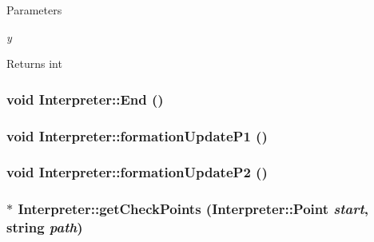 \begin{DoxyParams}{Parameters}
\item[{\em y}]\end{DoxyParams}
\begin{DoxyReturn}{Returns}
int 
\end{DoxyReturn}
\hypertarget{classInterpreter_aa7c368c159002202e99b2c8b47acc534}{
\subsubsection[{End}]{\setlength{\rightskip}{0pt plus 5cm}void Interpreter::End ()}}
\label{classInterpreter_aa7c368c159002202e99b2c8b47acc534}
\hypertarget{classInterpreter_a0191e3c65605b0ebadb696cf540951ee}{
\subsubsection[{formationUpdateP1}]{\setlength{\rightskip}{0pt plus 5cm}void Interpreter::formationUpdateP1 ()}}
\label{classInterpreter_a0191e3c65605b0ebadb696cf540951ee}
\hypertarget{classInterpreter_aa722fe96daeb04f61352559e6d29dda6}{
\subsubsection[{formationUpdateP2}]{\setlength{\rightskip}{0pt plus 5cm}void Interpreter::formationUpdateP2 ()}}
\label{classInterpreter_aa722fe96daeb04f61352559e6d29dda6}
\hypertarget{classInterpreter_a17b252478116fc19ab8fe4623728cda8}{
\subsubsection[{getCheckPoints}]{ $\ast$ Interpreter::getCheckPoints ({\bf Interpreter::Point} {\em start}, \/  string {\em path})}}
\label{classInterpreter_a17b252478116fc19ab8fe4623728cda8}

